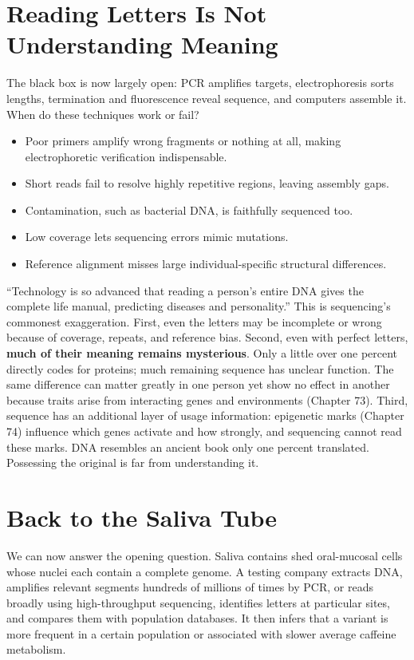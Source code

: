\section{Reading Letters Is Not Understanding Meaning}

The black box is now largely open: PCR amplifies targets, electrophoresis sorts lengths, termination and fluorescence reveal sequence, and computers assemble it. When do these techniques work or fail?

\begin{itemize}[itemsep=2pt]
\item Poor primers amplify wrong fragments or nothing at all, making electrophoretic verification indispensable.
\item Short reads fail to resolve highly repetitive regions, leaving assembly gaps.
\item Contamination, such as bacterial DNA, is faithfully sequenced too.
\item Low coverage lets sequencing errors mimic mutations.
\item Reference alignment misses large individual-specific structural differences.
\end{itemize}

\begin{wuqu}
``Technology is so advanced that reading a person's entire DNA gives the complete life manual, predicting diseases and personality.'' This is sequencing's commonest exaggeration. First, even the letters may be incomplete or wrong because of coverage, repeats, and reference bias. Second, even with perfect letters, \textbf{much of their meaning remains mysterious}. Only a little over one percent directly codes for proteins; much remaining sequence has unclear function. The same difference can matter greatly in one person yet show no effect in another because traits arise from interacting genes and environments (Chapter 73). Third, sequence has an additional layer of usage information: epigenetic marks (Chapter 74) influence which genes activate and how strongly, and sequencing cannot read these marks. DNA resembles an ancient book only one percent translated. Possessing the original is far from understanding it.
\end{wuqu}

\section{Back to the Saliva Tube}

We can now answer the opening question. Saliva contains shed oral-mucosal cells whose nuclei each contain a complete genome. A testing company extracts DNA, amplifies relevant segments hundreds of millions of times by PCR, or reads broadly using high-throughput sequencing, identifies letters at particular sites, and compares them with population databases. It then infers that a variant is more frequent in a certain population or associated with slower average caffeine metabolism.

